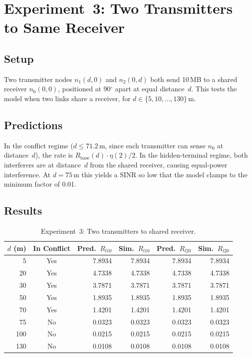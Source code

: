 \documentclass[11pt,a4paper]{article}
\begin{document}
\section{Experiment~3: Two Transmitters to Same Receiver}
\label{sec:exp3}

\subsection{Setup}
Two transmitter nodes $n_1(d,0)$ and $n_2(0,d)$ both send 10\,MB to a shared receiver $n_0(0,0)$, positioned at 90$^\circ$ apart at equal distance~$d$. This tests the model when two links share a receiver, for $d \in \{5, 10, \ldots, 130\}\,$m.

\subsection{Predictions}
In the conflict regime ($d \leq 71.2\,$m, since each transmitter can sense $n_0$ at distance~$d$), the rate is $R_{\text{base}}(d) \cdot \eta(2)/2$. In the hidden-terminal regime, both interferers are at distance~$d$ from the shared receiver, causing equal-power interference. At $d=75\,$m this yields a SINR so low that the model clamps to the minimum factor of 0.01.

\subsection{Results}

\begin{table}[h]
\centering
\caption{Experiment~3: Two transmitters to shared receiver.}
\label{tab:exp3}
\begin{tabular}{rcrrrr}
\toprule
$d$ (m) & In Conflict & Pred.\ $R_{l10}$ & Sim.\ $R_{l10}$ & Pred.\ $R_{l20}$ & Sim.\ $R_{l20}$ \\
\midrule
  5 & Yes & 7.8934 & 7.8934 & 7.8934 & 7.8934 \\
 20 & Yes & 4.7338 & 4.7338 & 4.7338 & 4.7338 \\
 30 & Yes & 3.7871 & 3.7871 & 3.7871 & 3.7871 \\
 50 & Yes & 1.8935 & 1.8935 & 1.8935 & 1.8935 \\
 70 & Yes & 1.4201 & 1.4201 & 1.4201 & 1.4201 \\
 75 &  No & 0.0323 & 0.0323 & 0.0323 & 0.0323 \\
100 &  No & 0.0215 & 0.0215 & 0.0215 & 0.0215 \\
130 &  No & 0.0108 & 0.0108 & 0.0108 & 0.0108 \\
\bottomrule
\end{tabular}
\end{table}
\end{document}
